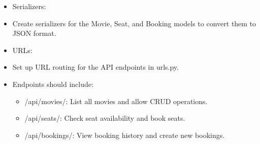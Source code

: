 \documentclass{article}
\begin{document}
\begin{itemize}
    \item Serializers:
\end{itemize}
\begin{itemize}
    \item Create serializers for the Movie, Seat, and Booking models to convert them to JSON format.
\end{itemize}
\begin{itemize}
    \item URLs:
\end{itemize}
\begin{itemize}
    \item Set up URL routing for the API endpoints in urls.py.
\end{itemize}
\begin{itemize}
            \item Endpoints should include:
            \begin{itemize}
                \item /api/movies/: List all movies and allow CRUD operations.
            \end{itemize}
            \begin{itemize}
                \item /api/seats/: Check seat availability and book seats.
            \end{itemize}
            \begin{itemize}
                \item /api/bookings/: View booking history and create new bookings.
            \end{itemize}
\end{itemize}
\end{document}
